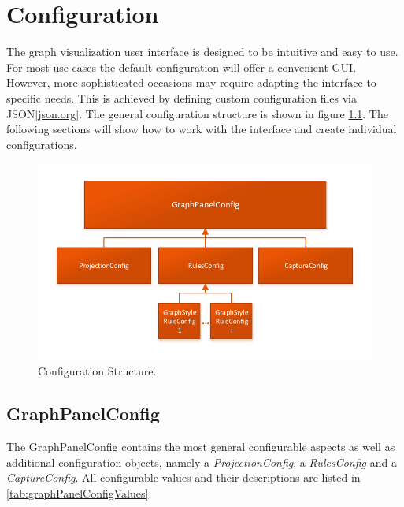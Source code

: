 \chapter{Configuration}
The graph visualization user interface is designed to be intuitive and easy to use. For most use cases the default configuration will offer a convenient GUI. However, more sophisticated occasions may require adapting the interface to specific needs. This is achieved by defining custom configuration files via JSON[\href{http://www.json.org}{json.org}]. The general configuration structure is shown in figure \ref{fig:configstruct}. The following sections will show how to work with the interface and create individual configurations.

\begin{figure} [h]
\centering
\includegraphics [scale=1] {images/configstruct.pdf}
\caption{Configuration Structure.}
\label{fig:configstruct}
\end{figure}


\section{GraphPanelConfig}
The GraphPanelConfig contains the most general configurable aspects as well as additional configuration objects, namely a \emph{ProjectionConfig}, a \emph{RulesConfig} and a \emph{CaptureConfig}. All configurable values and their descriptions are listed in \ref{tab:graphPanelConfigValues}.

